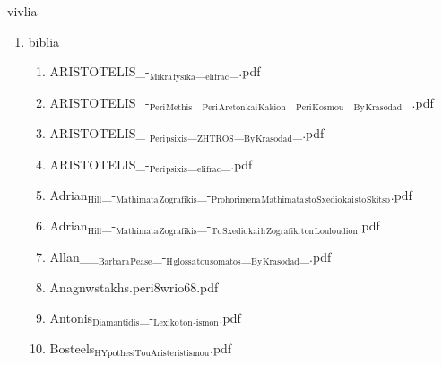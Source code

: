 \documentclass[11pt]{article}
\begin{document}
\item vivlia
\label{sec-1-1-1-1-49-2-2}
\begin{enumerate}
\item biblia
\label{sec-1-1-1-1-49-2-2-1}
\begin{enumerate}
\item ARISTOTELIS\_-$_{\text{Mikra}}$$_{\text{fysika}}$\_$_{\text{elifrac}}$\_.pdf
\label{sec-1-1-1-1-49-2-2-1-1}

\item ARISTOTELIS\_-$_{\text{Peri}}$$_{\text{Methis}}$\_$_{\text{Peri}}$$_{\text{Areton}}$$_{\text{kai}}$$_{\text{Kakion}}$\_$_{\text{Peri}}$$_{\text{Kosmou}}$\_$_{\text{By}}$$_{\text{Krasodad}}$\_.pdf
\label{sec-1-1-1-1-49-2-2-1-2}

\item ARISTOTELIS\_-$_{\text{Peri}}$$_{\text{psixis}}$\_$_{\text{ZHTROS}}$\_$_{\text{By}}$$_{\text{Krasodad}}$\_.pdf
\label{sec-1-1-1-1-49-2-2-1-3}

\item ARISTOTELIS\_-$_{\text{Peri}}$$_{\text{psixis}}$\_$_{\text{elifrac}}$\_.pdf
\label{sec-1-1-1-1-49-2-2-1-4}

\item Adrian$_{\text{Hill}}$\_-$_{\text{Mathimata}}$$_{\text{Zografikis}}$\_-$_{\text{Prohorimena}}$$_{\text{Mathimata}}$$_{\text{sto}}$$_{\text{Sxedio}}$$_{\text{kai}}$$_{\text{sto}}$$_{\text{Skitso}}$.pdf
\label{sec-1-1-1-1-49-2-2-1-5}

\item Adrian$_{\text{Hill}}$\_-$_{\text{Mathimata}}$$_{\text{Zografikis}}$\_-$_{\text{To}}$$_{\text{Sxedio}}$$_{\text{kai}}$$_{\text{h}}$$_{\text{Zografiki}}$$_{\text{ton}}$$_{\text{Louloudion}}$.pdf
\label{sec-1-1-1-1-49-2-2-1-6}

\item Allan\_\_$_{\text{Barbara}}$$_{\text{Pease}}$\_-$_{\text{H}}$$_{\text{glossa}}$$_{\text{tou}}$$_{\text{somatos}}$\_$_{\text{By}}$$_{\text{Krasodad}}$\_.pdf
\label{sec-1-1-1-1-49-2-2-1-7}

\item Anagnwstakhs.peri8wrio68.pdf
\label{sec-1-1-1-1-49-2-2-1-8}

\item Antonis$_{\text{Diamantidis}}$\_-$_{\text{Lexiko}}$$_{\text{ton}}$$_{\text{-ismon}}$.pdf
\label{sec-1-1-1-1-49-2-2-1-9}

\item Bosteels$_{\text{HYpothesiTouAristeristismou}}$.pdf
\label{sec-1-1-1-1-49-2-2-1-10}


\end{enumerate}
\end{enumerate}
\end{document}
